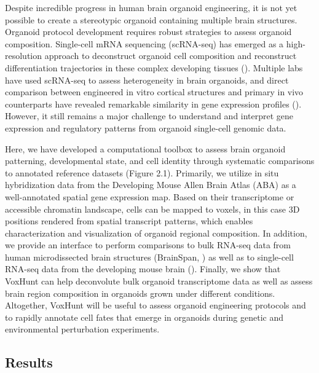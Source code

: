 Despite incredible progress in human brain organoid engineering, it is not yet possible to create a stereotypic organoid containing multiple brain structures.
Organoid protocol development requires robust strategies to assess organoid composition. Single-cell mRNA sequencing (scRNA-seq) has emerged as a high-resolution approach to deconstruct organoid cell composition and reconstruct differentiation trajectories in these complex developing tissues (\cite{camp_human_2015,kanton_organoid_2019,quadrato_cell_2017,velasco_individual_2019}). Multiple labs have used scRNA-seq to assess heterogeneity in brain organoids, and direct comparison between engineered in vitro cortical structures and primary in vivo counterparts have revealed remarkable similarity in gene expression profiles (\cite{camp_human_2015,pollen_establishing_2019}). However, it still remains a major challenge to understand and interpret gene expression and regulatory patterns from organoid single-cell genomic data. 

Here, we have developed a computational toolbox to assess brain organoid patterning, developmental state, and cell identity through systematic comparisons to annotated reference datasets (Figure 2.1). Primarily, we utilize in situ hybridization data from the Developing Mouse Allen Brain Atlas (ABA) as a well-annotated spatial gene expression map. Based on their transcriptome or accessible chromatin landscape, cells can be mapped to voxels, in this case 3D positions rendered from spatial transcript patterns, which enables characterization and visualization of organoid regional composition. In addition, we provide an interface to perform comparisons to bulk RNA-seq data from human microdissected brain structures (BrainSpan, \cite{thompson_high-resolution_2014}) as well as to single-cell RNA-seq data from the developing mouse brain (\cite{la_manno_molecular_2021}). Finally, we show that VoxHunt can help deconvolute bulk organoid transcriptome data as well as assess brain region composition in organoids grown under different conditions. Altogether, VoxHunt will be useful to assess organoid engineering protocols and to rapidly annotate cell fates that emerge in organoids during genetic and environmental perturbation experiments.


\subsection{Results}


